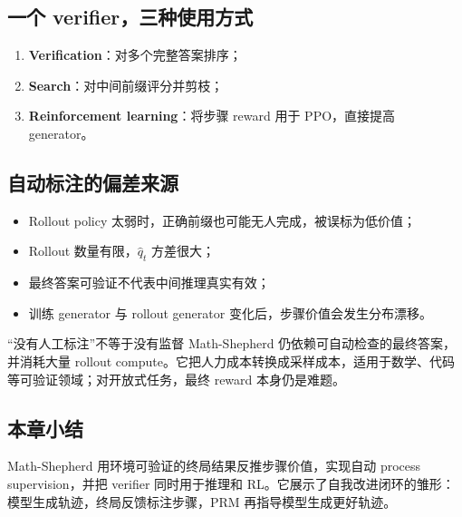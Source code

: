 \subsection{一个 verifier，三种使用方式}


\begin{enumerate}
    \item \textbf{Verification}：对多个完整答案排序；
    \item \textbf{Search}：对中间前缀评分并剪枝；
    \item \textbf{Reinforcement learning}：将步骤 reward 用于 PPO，直接提高 generator。
\end{enumerate}



\subsection{自动标注的偏差来源}

\begin{itemize}
    \item Rollout policy 太弱时，正确前缀也可能无人完成，被误标为低价值；
    \item Rollout 数量有限，$\hat q_t$ 方差很大；
    \item 最终答案可验证不代表中间推理真实有效；
    \item 训练 generator 与 rollout generator 变化后，步骤价值会发生分布漂移。
\end{itemize}

\begin{warningbox}{“没有人工标注”不等于没有监督}
Math-Shepherd 仍依赖可自动检查的最终答案，并消耗大量 rollout compute。它把人力成本转换成采样成本，适用于数学、代码等可验证领域；对开放式任务，最终 reward 本身仍是难题。
\end{warningbox}

\subsection{本章小结}

Math-Shepherd 用环境可验证的终局结果反推步骤价值，实现自动 process supervision，并把 verifier 同时用于推理和 RL。它展示了自我改进闭环的雏形：模型生成轨迹，终局反馈标注步骤，PRM 再指导模型生成更好轨迹。

